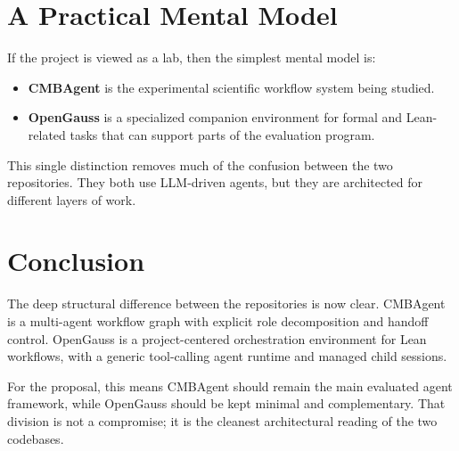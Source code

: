 \documentclass[11pt,a4paper]{article}
\begin{document}
\section{A Practical Mental Model}
If the project is viewed as a lab, then the simplest mental model is:
\begin{itemize}[leftmargin=1.5em]
\item \textbf{CMBAgent} is the experimental scientific workflow system being
studied.
\item \textbf{OpenGauss} is a specialized companion environment for formal and
Lean-related tasks that can support parts of the evaluation program.
\end{itemize}

This single distinction removes much of the confusion between the two
repositories. They both use LLM-driven agents, but they are architected for
different layers of work.

\section{Conclusion}
The deep structural difference between the repositories is now clear.
CMBAgent is a multi-agent workflow graph with explicit role decomposition and
handoff control. OpenGauss is a project-centered orchestration environment for
Lean workflows, with a generic tool-calling agent runtime and managed child
sessions.

For the proposal, this means CMBAgent should remain the main evaluated agent
framework, while OpenGauss should be kept minimal and complementary. That
division is not a compromise; it is the cleanest architectural reading of the
two codebases.
\end{document}
